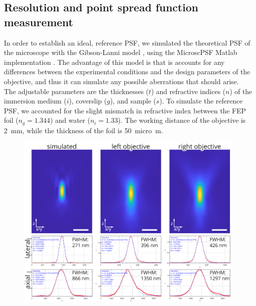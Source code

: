   


  \subsection{Resolution and point spread function measurement}

    In order to establish an ideal, reference PSF, we simulated the theoretical PSF of the microscope with the Gibson-Lanni model \cite{gibson_experimental_1992}, using the MicroscPSF Matlab implementation \cite{li_fast_2017}. The advantage of this model is that is accounts for any differences between the experimental conditions and the design parameters of the objective, and thus it can simulate any possible aberrations that should arise. The adjustable parameters are the thicknesses ($t$) and refractive indices ($n$) of the immersion medium ($i$), coverslip ($g$), and sample ($s$). To simulate the reference PSF, we accounted for the slight mismatch in refractive index between the FEP foil ($n_g = 1.344$) and water ($n_i = 1.33$). The working distance of the objective is \SI{2}{mm}, while the thickness of the foil is \SI{50}{micro m}. 

    \begin{figure}[htb]
      \centering
      \includegraphics[width=\textwidth]{PSF}
      \label{fig:measuredPSF}
    \end{figure}


